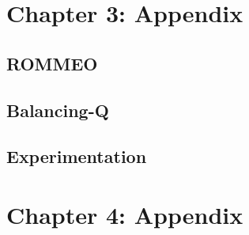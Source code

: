 \documentclass{report}
\begin{document}
\chapter{Chapter 3: Appendix}

\section {ROMMEO}


\section {Balancing-Q}


\section{Experimentation}


\chapter{Chapter 4: Appendix}




% 
\end{document}
